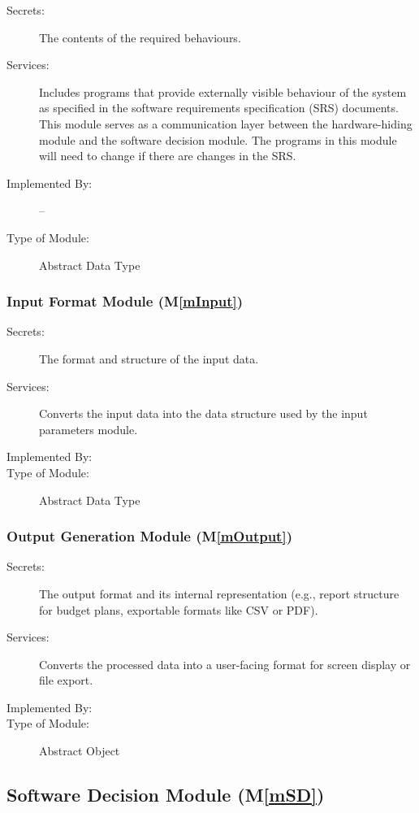 \documentclass[12pt, titlepage]{article}
\newcommand{\mref}[1]{M\ref{#1}}
\begin{document}
\begin{description}
\item[Secrets:]The contents of the required behaviours.
\item[Services:]Includes programs that provide externally visible behaviour of
  the system as specified in the software requirements specification (SRS)
  documents. This module serves as a communication layer between the
  hardware-hiding module and the software decision module. The programs in this
  module will need to change if there are changes in the SRS.
\item[Implemented By:] --
\item[Type of Module:] Abstract Data Type
\end{description}

\subsubsection{Input Format Module (\mref{mInput})}

\begin{description}
\item[Secrets:]The format and structure of the input data.
\item[Services:]Converts the input data into the data structure used by the
  input parameters module.
\item[Implemented By:] \progname
\item[Type of Module:] Abstract Data Type
\end{description}

\subsubsection{Output Generation Module (\mref{mOutput})}

\begin{description}
\item[Secrets:] The output format and its internal representation (e.g., report structure for budget plans, exportable formats like CSV or PDF).
\item[Services:] Converts the processed data into a user-facing format for screen display or file export.
\item[Implemented By:] \progname
\item[Type of Module:] Abstract Object
\end{description}


\subsection{Software Decision Module (\mref{mSD})}
\end{document}
